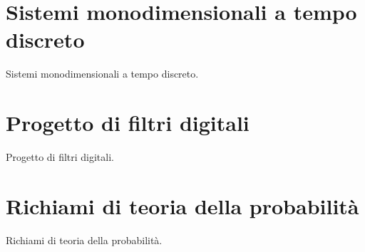 \documentclass[12pt,oneside,openany]{memoir}
\numberwithin{equation}{subsection}
\begin{document}
\section{Sistemi monodimensionali a tempo discreto}
Sistemi monodimensionali a tempo discreto.


\section{Progetto di filtri digitali}
Progetto di filtri digitali.


\newpage
\section{Richiami di teoria della probabilit\`a}
Richiami di teoria della probabilit\`a.

\end{document}
